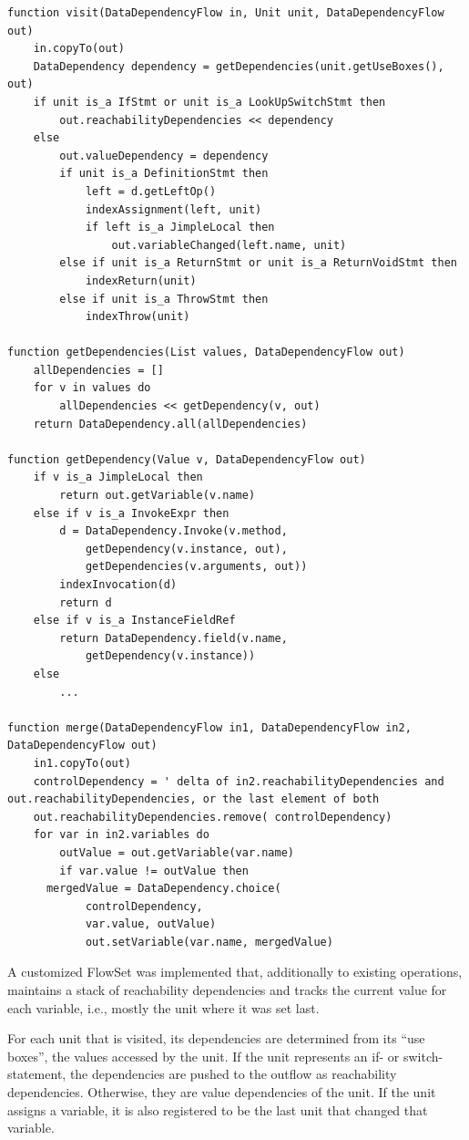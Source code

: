 \begin{lstlisting}[firstnumber=1,float,caption={Our dependency algorithm in pseudocode.},stepnumber=5,label=lst:visit,gobble=0,language=algorithm,tabsize=2]
function visit(DataDependencyFlow in, Unit unit, DataDependencyFlow out)
	in.copyTo(out)
	DataDependency dependency = getDependencies(unit.getUseBoxes(), out)
	if unit is_a IfStmt or unit is_a LookUpSwitchStmt then
		out.reachabilityDependencies << dependency
	else
		out.valueDependency = dependency
		if unit is_a DefinitionStmt then
			left = d.getLeftOp()
			indexAssignment(left, unit)
			if left is_a JimpleLocal then
				out.variableChanged(left.name, unit)
		else if unit is_a ReturnStmt or unit is_a ReturnVoidStmt then
			indexReturn(unit)
		else if unit is_a ThrowStmt then
			indexThrow(unit)

function getDependencies(List values, DataDependencyFlow out)
	allDependencies = []
	for v in values do
		allDependencies << getDependency(v, out)
	return DataDependency.all(allDependencies)

function getDependency(Value v, DataDependencyFlow out)
	if v is_a JimpleLocal then
		return out.getVariable(v.name)
	else if v is_a InvokeExpr then
		d = DataDependency.Invoke(v.method,
			getDependency(v.instance, out),
			getDependencies(v.arguments, out))
		indexInvocation(d)
		return d
	else if v is_a InstanceFieldRef
		return DataDependency.field(v.name,
			getDependency(v.instance))
	else 
		...

function merge(DataDependencyFlow in1, DataDependencyFlow in2, DataDependencyFlow out)
	in1.copyTo(out)
	controlDependency = ' delta of in2.reachabilityDependencies and out.reachabilityDependencies, or the last element of both
	out.reachabilityDependencies.remove( controlDependency)
	for var in in2.variables do
		outValue = out.getVariable(var.name)
		if var.value != outValue then
      mergedValue = DataDependency.choice(
            controlDependency, 
            var.value, outValue)
			out.setVariable(var.name, mergedValue)
\end{lstlisting}


A customized FlowSet was implemented that, additionally to existing operations, maintains a stack of reachability dependencies and tracks the current value for each variable, i.e., mostly the unit where it was set last.

For each unit that is visited, its dependencies are determined from its ``use boxes'', the values accessed by the unit.
If the unit represents an if- or switch-statement, the dependencies are pushed to the outflow as reachability dependencies.
Otherwise, they are value dependencies of the unit.
If the unit assigns a variable, it is also registered to be the last unit that changed that variable.

